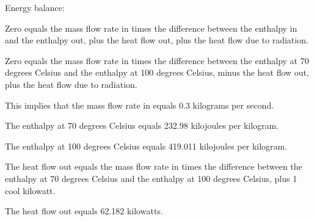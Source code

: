 Energy balance:

Zero equals the mass flow rate in times the difference between the enthalpy in and the enthalpy out, plus the heat flow out, plus the heat flow due to radiation.

Zero equals the mass flow rate in times the difference between the enthalpy at 70 degrees Celsius and the enthalpy at 100 degrees Celsius, minus the heat flow out, plus the heat flow due to radiation.

This implies that the mass flow rate in equals 0.3 kilograms per second.

The enthalpy at 70 degrees Celsius equals 232.98 kilojoules per kilogram.

The enthalpy at 100 degrees Celsius equals 419.011 kilojoules per kilogram.

The heat flow out equals the mass flow rate in times the difference between the enthalpy at 70 degrees Celsius and the enthalpy at 100 degrees Celsius, plus 1 cool kilowatt.

The heat flow out equals 62.182 kilowatts.